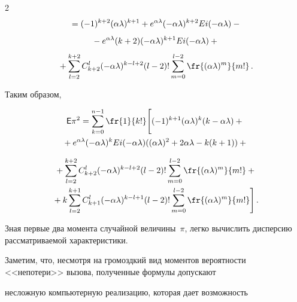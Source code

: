 \begin{multicols}{2}
\begin{multline*}
{}=(-1)^{k+2}(\alpha\lambda)^{k+1}+e^{\alpha\lambda}(-\alpha\lambda)^{k+2}


Ei(-\alpha\lambda)-{}\\[4pt]


{}- e^{\alpha\lambda}(k+2)(-\alpha\lambda)^{k+1}Ei(-\alpha\lambda)+{}\\[4pt]


{}+\sum_{l=2}^{k+2}C_{k+2}^l(-\alpha\lambda)^{k-l+2}


(l-2)!\sum_{m=0}^{l-2}\fr{(\alpha\lambda)^m}{m!}\,.


\end{multline*}


%


Таким образом,


\begin{multline*}


\e\pi^2=


\sum_{k=0}^{n-1}\fr{1}{k!}\Bigg[(-1)^{k+1}(\alpha\lambda)^{k}(k-\alpha\lambda)+{}\\


{}+e^{\alpha\lambda}(-\alpha\lambda)^{k}Ei(-\alpha\lambda)((\alpha\lambda)^{2}+2\alpha\lambda-k(k+1))+{} %


\end{multline*}





\noindent


\begin{multline*}


{}+\sum_{l=2}^{k+2}C_{k+2}^l(-\alpha\lambda)^{k-l+2}(l-2)!\sum_{m=0}^{l-2}\fr{(\alpha\lambda)^m}{m!}+{}\\


{}+k\sum_{l=2}^{k+1}C_{k+1}^l(-\alpha\lambda)^{k-l+1}(l-2)!\sum_{m=0}^{l-2}\fr{(\alpha\lambda)^m}{m!}\Bigg]\,.


\end{multline*}





Зная первые два момента случайной величины~$\pi$, легко вычислить дисперсию рассматриваемой характеристики.





Заметим, что, несмотря на громоздкий вид момен\-тов вероятности <<непотери>> вызова, по\-лу\-чен\-ные формулы допускают


несложную компьютерную реализацию, которая дает возможность %



\end{multicols}
